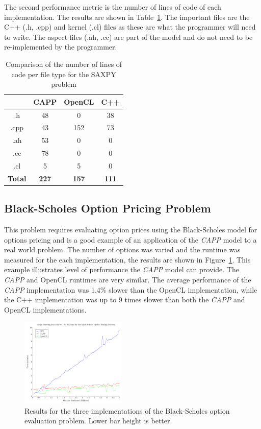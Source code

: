 \documentclass{sig-alternate-05-2015}
\begin{document}
The second performance metric is the number of lines
of code of each implementation. The results are shown in 
Table~\ref{tab:saxpy}. The important files are the C++ (.h, .cpp) and kernel (.cl)
files as these are what the programmer will need to write. The aspect files (.ah, .cc) are
part of the  model and do not need to be re-implemented by the programmer. 

\begin{table}[!b]
\centering
\caption{Comparison of the number of lines of code per file type for the SAXPY
problem }
\label{tab:saxpy}
\begin{tabular}{|c|c|c|c|} 
	\hline
				& CAPP			& OpenCL		& C++	\\ \hline
.h				& 48			& 0				& 38	\\ \hline
.cpp			& 43			& 152			& 73	\\ \hline
.ah				& 53			& 0				& 0		\\ \hline
.cc				& 78			& 0				& 0		\\ \hline
.cl				& 5				& 5				& 0		\\ \hline
\textbf{Total}	& \textbf{227}	& \textbf{157}	& \textbf{111}		\\ \hline		
\hline
\end{tabular}
\end{table}

\subsection{Black-Scholes Option Pricing Problem}

This problem requires evaluating option prices using the Black-Scholes 
model for options pricing and is a good example of an application of the \textit{CAPP} 
model to a real world problem. The number of options was varied and the
runtime was measured for the each implementation, the results are shown in 
Figure~\ref{fig:blackscholes}. 
This example illustrates level of performance the \textit{CAPP} model can
provide. The \textit{CAPP} and OpenCL runtimes are very similar. The average 
performance of the \textit{CAPP} implementation was 1.4\% slower than the
OpenCL implementation, while the C++ implementation was up to 9 times slower
than both the \textit{CAPP} and OpenCL implementations.

\begin{figure}[!t]
	\centering
	\includegraphics[width=0.45\textwidth]{BlackScholes}
	\caption{Results for the three implementations of the Black-Scholes option
		evaluation problem. Lower
	bar height is better.}
	\label{fig:blackscholes}
\end{figure}
\end{document}
